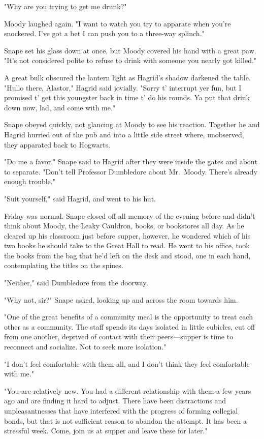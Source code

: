 "Why are you trying to get me drunk?"

Moody laughed again. "I want to watch you try to apparate when you're snockered. I've got a bet I can push you to a three-way splinch."

Snape set his glass down at once, but Moody covered his hand with a great paw. "It's not considered polite to refuse to drink with someone you nearly got killed."

A great bulk obscured the lantern light as Hagrid's shadow darkened the table. "Hullo there, Alastor," Hagrid said jovially. "Sorry t' interrupt yer fun, but I promised t' get this youngster back in time t' do his rounds. Ya put that drink down now, lad, and come with me."

Snape obeyed quickly, not glancing at Moody to see his reaction. Together he and Hagrid hurried out of the pub and into a little side street where, unobserved, they apparated back to Hogwarts.

"Do me a favor," Snape said to Hagrid after they were inside the gates and about to separate. "Don't tell Professor Dumbledore about Mr.~Moody. There's already enough trouble."

"Suit yourself," said Hagrid, and went to his hut.

Friday was normal. Snape closed off all memory of the evening before and didn't think about Moody, the Leaky Cauldron, books, or bookstores all day. As he cleared up his classroom just before supper, however, he wondered which of his two books he should take to the Great Hall to read. He went to his office, took the books from the bag that he'd left on the desk and stood, one in each hand, contemplating the titles on the spines.

"Neither," said Dumbledore from the doorway.

"Why not, sir?" Snape asked, looking up and across the room towards him.

"One of the great benefits of a community meal is the opportunity to treat each other as a community. The staff spends its days isolated in little cubicles, cut off from one another, deprived of contact with their peers—supper is time to reconnect and socialize. Not to seek more isolation."

"I don't feel comfortable with them all, and I don't think they feel comfortable with me."

"You are relatively new. You had a different relationship with them a few years ago and are finding it hard to adjust. There have been distractions and unpleasantnesses that have interfered with the progress of forming collegial bonds, but that is not sufficient reason to abandon the attempt. It has been a stressful week. Come, join us at supper and leave these for later."


